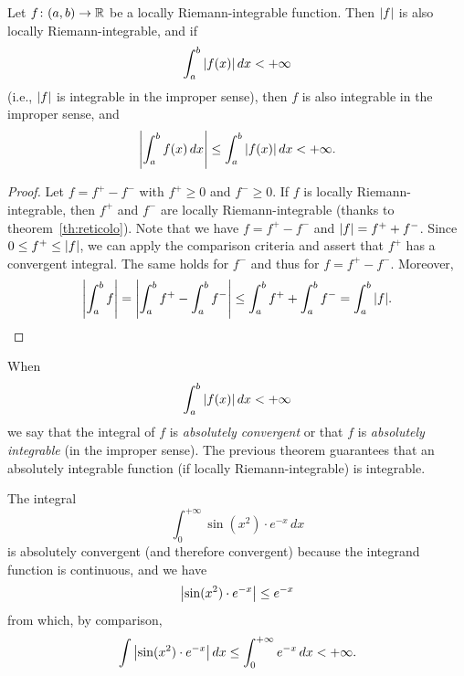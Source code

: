 \begin{theorem}
\label{th:convergenza_assoluta_integrale}
\mymark{**}%
Let $f\colon (a,b)\to {\mathbb R}$ be a locally Riemann-integrable function. Then
${\left|f\right|}$ is also locally Riemann-integrable, and if
\[
\int_a^b {\left|f(x)\right|}\, dx < +\infty
\]
(i.e., ${\left|f\right|}$ is integrable in the improper sense), then $f$ is also
integrable in the improper sense, and
\[
  {\left|\int_a^b f(x)\,dx\right|}
  \le \int_a^b {\left|f(x)\right|}\, dx < +\infty.
\]
\end{theorem}
%
%
\begin{proof}
Let $f = f^+ - f^-$ with $f^+\ge 0$ and $f^-\ge 0$. If $f$ is locally
Riemann-integrable, then $f^+$ and $f^-$ are locally Riemann-integrable (thanks
to theorem~\ref{th:reticolo}). Note that we have $f = f^+ - f^-$ and ${\left|f\right|} =
f^+ + f^-$. Since $0\le f^+ \le {\left|f\right|}$, we can apply the comparison criteria
and assert that $f^+$ has a convergent integral. The same holds for $f^-$ and
thus for $f=f^+ - f^-$. Moreover,
\[
  {\left|\int_a^b f \right|}
  = {\left|\int_a^b f^+ - \int_a^b f^-\right|}
  \le \int_a^b f^+ + \int_a^b f^-
  = \int_a^b {\left|f\right|}.
\]
\end{proof}

\begin{definition}
%
%
%
%
%
When
\[
  \int_a^b {\left|f(x)\right|}\, dx <+\infty
\]
we say that the integral of $f$ is \emph{absolutely convergent} or that $f$ is
\emph{absolutely integrable} (in the improper sense). The previous theorem
guarantees that an absolutely integrable function (if locally
Riemann-integrable) is integrable.
\end{definition}

\begin{example}
The integral
\[
  \int_0^{+\infty} \sin(x^2)\cdot e^{-x}\, dx
\]
is absolutely convergent (and therefore convergent) because the integrand
function is continuous, and we have
\[
 {\left|\sin(x^2)\cdot e^{-x}\right|} \le e^{-x}
\]
from which, by comparison,
\[
 \int {\left|\sin(x^2)\cdot e^{-x}\right|}\, dx  \le
  \int_0^{+\infty} e^{-x}\, dx < +\infty.
\]
\end{example}


